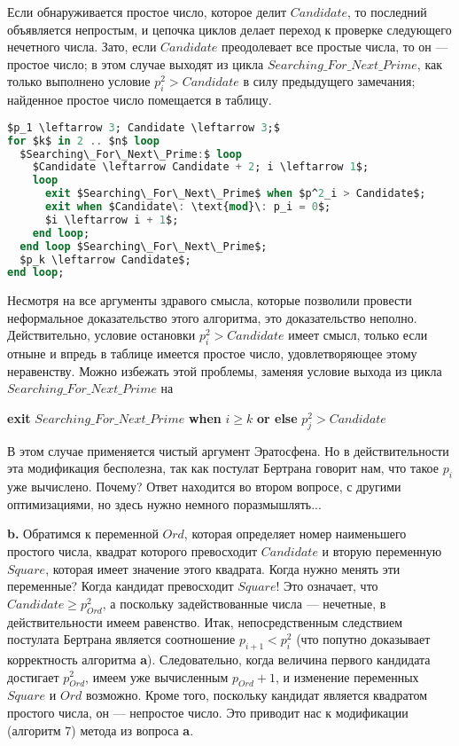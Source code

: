 Если обнаруживается простое число, которое делит $Candidate$, то последний объявляется непростым,
и цепочка циклов делает переход к проверке следующего нечетного числа. Зато,
если $Candidate$ преодолевает все простые числа, то он — простое число; в этом случае
выходят из цикла $Searching\_For\_Next\_Prime$, как только выполнено условие $p^2_i > Candidate$
в силу предыдущего замечания; найденное простое число помещается в таблицу.

\begin{lstlisting}[mathescape=true, language=Ada, caption=Генерация простых чисел]
$p_1 \leftarrow 3; Candidate \leftarrow 3;$
for $k$ in 2 .. $n$ loop
  $Searching\_For\_Next\_Prime:$ loop
    $Candidate \leftarrow Candidate + 2; i \leftarrow 1$;
    loop
      exit $Searching\_For\_Next\_Prime$ when $p^2_i > Candidate$;
      exit when $Candidate\: \text{mod}\: p_i = 0$;
      $i \leftarrow i + 1$;
    end loop;
  end loop $Searching\_For\_Next\_Prime$;
  $p_k \leftarrow Candidate$;
end loop;
\end{lstlisting}

Несмотря на все аргументы здравого смысла, которые позволили
провести неформальное доказательство этого алгоритма, это доказательство
неполно. Действительно, условие остановки $p^2_i > Candidate$ имеет смысл, только если отныне и впредь в таблице имеется простое число, удовлетворяющее этому неравенству. Можно избежать этой проблемы, заменяя условие выхода из цикла $Searching\_For\_Next\_Prime$ на\newline

\textbf{exit} $Searching\_For\_Next\_Prime$ \textbf{when} $i \geqslant k$ \textbf{or else} $p^2_j > Candidate$\newline

В этом случае применяется чистый аргумент Эратосфена. Но в действительности
эта модификация бесполезна, так как постулат Бертрана говорит нам,
что такое $p_i$ уже вычислено. Почему? Ответ находится во втором вопросе,
с другими оптимизациями, но здесь нужно немного поразмышлять...
\newpage

\textbf{b.} Обратимся к переменной $Ord$, которая определяет номер наименьшего простого числа,
квадрат которого превосходит $Candidate$ и вторую переменную $Square$, которая имеет
значение этого квадрата. Когда нужно менять эти переменные? Когда кандидат
превосходит $Square$! Это означает, что $Candidate \geqslant p^2_{Ord}$, а поскольку задействованные
числа — нечетные, в действительности имеем равенство. Итак, непосредственным следствием
постулата Бертрана является соотношение $p_{i+1} < p^2_i$ (что попутно доказывает корректность алгоритма \textbf{a}).
Следовательно, когда величина первого кандидата достигает $p^2_{Ord}$, имеем уже вычисленным $p_{Ord} + 1$,
и изменение переменных $Square$ и $Ord$ возможно. Кроме того, поскольку кандидат является
квадратом простого числа, он — непростое число. Это приводит нас к модификации (алгоритм 7) метода из вопроса \textbf{a}.

